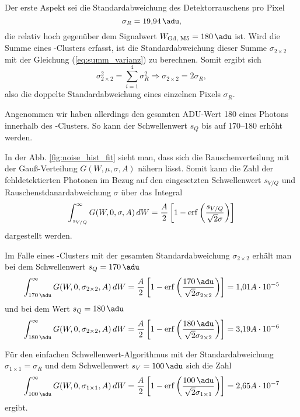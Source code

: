 \noindent
Der erste Aspekt sei die Standardabweichung des Detektorrauschens pro Pixel
\begin{equation}
    \sigma_R = \SI{19.94}{\adu},
\end{equation}
die relativ hoch gegenüber dem Signalwert $W_\text{Gd, M5} = \SI{180}{\adu}$ ist. Wird die Summe eines -Clusters erfasst, ist die Standardabweichung dieser Summe $\sigma_{2\times 2}$ mit der Gleichung (\ref{eq:summ_varianz}) zu berechnen. Somit ergibt sich
\begin{equation}
    \sigma_{2\times 2}^2 = \sum_{i=1}^4\sigma_R^2 \Rightarrow \sigma_{2\times 2} = 2\sigma_R,
\end{equation}
also die doppelte Standardabweichung eines einzelnen Pixels $\sigma_R$.

\noindent
Angenommen wir haben allerdings den gesamten ADU-Wert \SI{180}{\adu} eines Photons innerhalb des -Clusters. So kann der Schwellenwert $s_Q$ bis auf \qtyrange{170}{180}{\adu} erhöht werden.

\noindent
In der Abb. \ref{fig:noise_hist_fit} sieht man, dass sich die Rauschenverteilung mit der Gauß-Verteilung $G(W, \mu, \sigma, A)$ nähern lässt. Somit kann die Zahl der fehldetektierten Photonen im Bezug auf den eingesetzten Schwellenwert $s_{V/Q}$ und Rauschenstdanardabweichung $\sigma$ über das Integral 
\begin{equation}
    \int_{s_{V/Q}}^\infty G(W, 0, \sigma, A) \,dW = \frac{A}{2}\left[1 - \operatorname{erf}\left({\frac{s_{V/Q}}{\sqrt{2}\sigma}}\right)\right]
\end{equation}
\noindent
dargestellt werden.

\noindent
Im Falle eines -Clusters mit der gesamten Standardabweichung $\sigma_{2\times 2}$ erhält man bei dem Schwellenwert $s_Q = \SI{170}{\adu}$
\begin{equation}
    \int_{\SI{170}{\adu}}^\infty G(W, 0, \sigma_{2\times 2}, A) \,dW = \frac{A}{2}\left[1 - \erf\left({\frac{\SI{170}{\adu}}{\sqrt{2}\sigma_{2\times 2}}}\right)\right] = 1{,}01A\cdot 10^{-5}
\end{equation}
\noindent
und bei dem Wert $s_Q = \SI{180}{\adu}$
\begin{equation}
    \int_{\SI{180}{\adu}}^\infty G(W, 0, \sigma_{2\times 2}, A) \,dW = \frac{A}{2}\left[1 - \erf\left({\frac{\SI{180}{\adu}}{\sqrt{2}\sigma_{2\times 2}}}\right)\right] = 3{,}19A\cdot 10^{-6}
\end{equation}

\noindent
Für den einfachen Schwellenwert-Algorithmus mit der Standardabweichung $\sigma_{1\times 1} = \sigma_{R}$ und dem Schwellenwert $s_V = \SI{100}{\adu}$ sich die Zahl
\begin{equation}
    \int_{\SI{100}{\adu}}^\infty G(W, 0, \sigma_{1\times 1}, A) \,dW = \frac{A}{2}\left[1 - \erf\left({\frac{\SI{100}{\adu}}{\sqrt{2}\sigma_{1\times 1}}}\right)\right] = 2{,}65A\cdot 10^{-7}
\end{equation}
ergibt.

